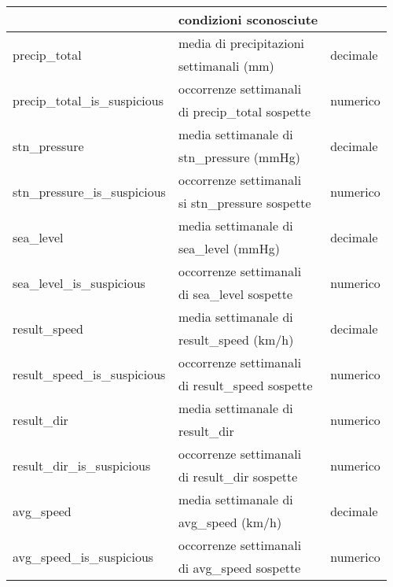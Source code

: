 \begin{longtable}{lll}
	& condizioni sconosciute & \\ \hline
	\multirow{2}{*}{precip\_total}		& media di precipitazioni 	 & 
	\multirow{2}{*}{decimale}			\\ 
	& settimanali (mm) &\\\hline	
	\multirow{2}{*}{precip\_total\_is\_suspicious}		& occorrenze 
	settimanali & \multirow{2}{*}{numerico}	\\
	& di precip\_total sospette	& \\\hline	
	\multirow{2}{*}{stn\_pressure}		& media settimanale	di  & 	
	\multirow{2}{*}{decimale}		\\ 
	& stn\_pressure (mmHg) &\\ \hline	
	\multirow{2}{*}{stn\_pressure\_is\_suspicious}		& occorrenze 
	settimanali & \multirow{2}{*}{numerico}	\\
	& si stn\_pressure sospette &	 \\ 	\hline	
	\multirow{2}{*}{sea\_level}		& media settimanale di 	 & 	
	\multirow{2}{*}{decimale}		\\ 
	& sea\_level (mmHg)&\\ \hline	
	\multirow{2}{*}{sea\_level\_is\_suspicious}		& occorrenze settimanali & 
	\multirow{2}{*}{numerico}	\\ 
	& di sea\_level sospette &	 \\	\hline
	\multirow{2}{*}{result\_speed}		& media settimanale di  
	&	\multirow{2}{*}{decimale}	\\ 
	& result\_speed (km/h) &\\	\hline	
	\multirow{2}{*}{result\_speed\_is\_suspicious}		& occorrenze 
	settimanali & \multirow{2}{*}{numerico}	\\
	& di result\_speed sospette & 	 \\	\hline	
	\multirow{2}{*}{result\_dir}	& media settimanale di  	& 	
	\multirow{2}{*}{numerico}	\\ 
	& result\_dir &\\	\hline	
	\multirow{2}{*}{result\_dir\_is\_suspicious}		& occorrenze 
	settimanali & \multirow{2}{*}{numerico}	\\
	& di result\_dir sospette &	 \\	\hline		
	\multirow{2}{*}{avg\_speed}		& media settimanale di	 & 	
	\multirow{2}{*}{decimale}	\\ 
	& avg\_speed (km/h) &\\\hline	
	\multirow{2}{*}{avg\_speed\_is\_suspicious}		& occorrenze settimanali & 
	\multirow{2}{*}{numerico}	\\
	& di avg\_speed sospette &	 \\	\hline		

\end{longtable}
